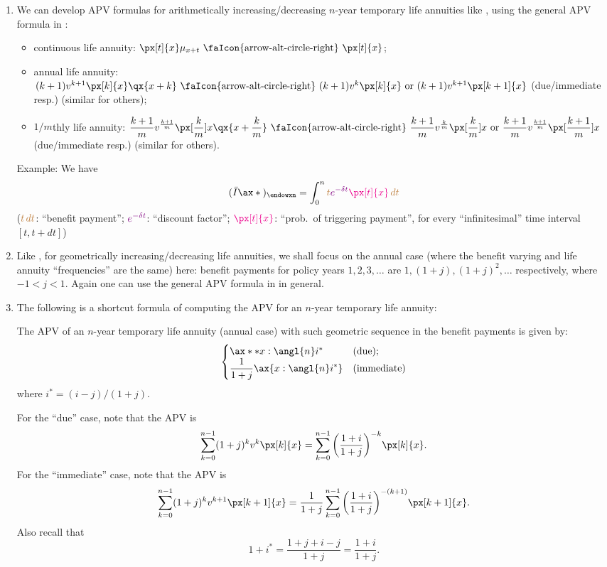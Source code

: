 \begin{enumerate}
\item \label{it:as-tmp-annuity-fmlas}
We can develop APV formulas for arithmetically increasing/decreasing
\(n\)-year temporary life annuities like ,
using the general APV formula in :
\begin{itemize}
\item continuous life annuity: \(\px[t]{x}\mu_{x+t}\text{ \faIcon{arrow-alt-circle-right} }\px[t]{x}\);
\item annual life annuity: \((k+1)v^{k+1}\px[k]{x}\qx{x+k}\text{
\faIcon{arrow-alt-circle-right} }(k+1)v^{k}\px[k]{x}\text{ or
}(k+1)v^{k+1}\px[k+1]{x}\) (due/immediate resp.) (similar for others);
\item \(1/m\)thly life annuity: \(\displaystyle
\frac{k+1}{m}v^{\frac{k+1}{m}}\px[\frac{k}{m}]{x}\qx{x+\frac{k}{m}} \text{
\faIcon{arrow-alt-circle-right} }
\frac{k+1}{m}v^{\frac{k}{m}}\px[\frac{k}{m}]{x}\text{ or }
\frac{k+1}{m}v^{\frac{k+1}{m}}\px[\frac{k+1}{m}]{x}\) (due/immediate resp.)
(similar for others).
\end{itemize}
Example: We have
\[
(\bar{I}\ax*{})_{\endowxn}=\int_{0}^{n}{\color{brown}t}{\color{violet}e^{-\delta
t}}{\color{magenta}\px[t]{x}}\,{\color{brown}dt}
\]
(\({\color{brown}t\,dt}\): ``benefit payment''; \({\color{violet}e^{-\delta
t}}\): ``discount factor''; \({\color{magenta}\px[t]{x}}\): ``prob.\ of
triggering payment'', for every ``infinitesimal'' time interval \([t,t+dt]\))

\item Like , for geometrically
increasing/decreasing life annuities, we shall focus on the annual case (where
the benefit varying and life annuity ``frequencies'' are the same) here:
benefit payments for policy years \(1,2,3,\dotsc\) are
\(1,(1+j),(1+j)^2,\dotsc\) respectively, where \(-1<j<1\). Again one can use
the general APV formula in  in general.

\item The following is a shortcut formula of computing the APV for an
\(n\)-year temporary life annuity:
\begin{proposition}
\label{prp:gs-tmp-annuity-fmla}
The APV of an \(n\)-year temporary life annuity (annual case) with such
geometric sequence in the benefit payments is given by:
\[
\begin{cases}
\ax**{x:\angl{n}i^{*}}&\text{(due)}; \\
\displaystyle 
\frac{1}{1+j}\ax{x:\angl{n}i^{*}}&\text{(immediate)}
\end{cases}
\]
where \(i^*=(i-j)/(1+j)\).
\end{proposition}
\begin{pf}
For the ``due'' case, note that the APV is
\[
\sum_{k=0}^{n-1}(1+j)^{k}v^k\px[k]{x}
=\sum_{k=0}^{n-1}\qty(\frac{1+i}{1+j})^{-k}\px[k]{x}.
\]
For the ``immediate'' case, note that the APV is
\[
\sum_{k=0}^{n-1}(1+j)^{k}v^{k+1}\px[k+1]{x}
=\frac{1}{1+j}\sum_{k=0}^{n-1}\qty(\frac{1+i}{1+j})^{-(k+1)}\px[k+1]{x}.
\]
Also recall that
\[
1+i^*=\frac{1+j+i-j}{1+j}=\frac{1+i}{1+j}.
\]
\end{pf}


\end{enumerate}
